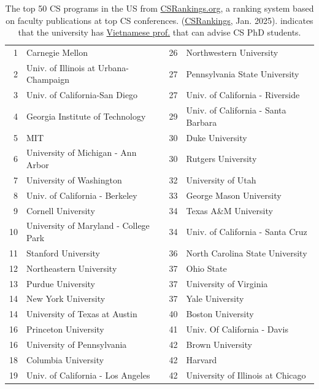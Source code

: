 \documentclass[oneside,11pt,dvipsnames]{book}
\newcommand{\red}[1]{{\color{red}{#1}}}
\begin{document}
\begin{table}
  \centering
  \small
  \caption{The top 50 CS programs in the US from \href{https://www.csrankings.org}{CSRankings.org}, a ranking system  based on faculty publications at top CS conferences. (\href{https://csrankings.org}{CSRankings}, Jan. 2025). \red{$^*$} indicates that the university has \href{https://github.com/dynaroars/dynaroars.github.io/wiki/Viet-CS-Profs-US}{Vietnamese prof.} that can advise CS PhD students.}\label{tab:ranking}
  \begin{tabular}{rl|rl}
    \toprule
    1 & Carnegie Mellon & 26 & Northwestern University\\
    2 & Univ. of Illinois at Urbana-Champaign\red{$^*$}  & 27 & Pennsylvania State University  \\
    3 & Univ. of California-San Diego & 27 & Univ. of California - Riverside \\
    4 & Georgia Institute of Technology & 29 & Univ. of California - Santa Barbara \\
    5 & MIT                            & 30 &   Duke University \\
    6 & University of Michigan - Ann Arbor\red{$^*$}  & 30 & Rutgers University\red{$^*$} \\
    7 & University of Washington    & 32& University of Utah\\
    8 & Univ. of California - Berkeley    &33 & George Mason University\red{$^*$}\\
    9 & Cornell University   &34&   Texas A\&M University\red{$^*$}  \\
    10 & University of Maryland - College Park & 34 &  Univ. of California - Santa Cruz \\
    11 & Stanford University  &  36& North Carolina State University \\
    12 & Northeastern University\red{$^*$} &37& Ohio State \\
    13 & Purdue University &37& University of Virginia  \\
    14 & New York University  &37 & Yale University \\
    14 & University of Texas at Austin &40& Boston University  \\
    16 & Princeton University\red{$^*$}&41 & Univ. Of California - Davis \\
    16 & University of Pennsylvania  &42 & Brown University \\
    18 & Columbia University\red{$^*$}  & 42& Harvard \\
    19 & Univ. of California - Los Angeles  & 42& University of Illinois at Chicago  \\

\end{tabular}
\end{table}
\end{document}
